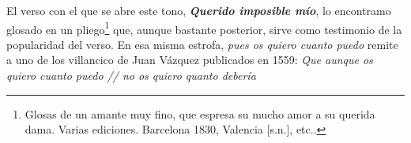 El verso con el que se abre este tono, \textit{\textbf{Querido imposible mío}}, lo encontramo glosado en un pliego\footnote{Glosas de un amante muy fino, que espresa su mucho amor a su querida dama. Varias ediciones. Barcelona 1830, Valencia [s.n.], etc.. } que, aunque bastante posterior, sirve como testimonio de la popularidad del verso. En esa misma estrofa, \textit{pues os quiero cuanto puedo} remite a uno de los villancico de Juan Vázquez publicados en 1559: \textit{Que aunque os quiero cuanto puedo // no os quiero quanto debería}
